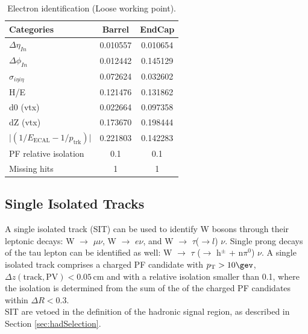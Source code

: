 \begin{table}[h!]
  \caption{Electron identification (Loose working point).\label{tab:ele-id}}
  \centering
  \footnotesize
  \begin{tabular}{ lcc }
    \hline
    \hline
    Categories                                               & Barrel    & EndCap    \\
    \hline
    $\Delta \eta_{In}$                                       & 0.010557  & 0.010654  \\
    $\Delta \phi_{In}$                                       & 0.012442  & 0.145129  \\
    $\sigma_{i\eta i\eta}$                                   & 0.072624  & 0.032602  \\
    H/E                                                      & 0.121476  & 0.131862  \\
    d0 (vtx)                                                 & 0.022664  & 0.097358  \\
    dZ (vtx)                                                 & 0.173670  & 0.198444  \\
    $\lvert(1/E_{\textrm{ECAL}} - 1/p_{\textrm{trk}})\rvert$ & 0.221803  & 0.142283  \\
    PF relative isolation                                    & 0.1       & 0.1       \\
    Missing hits                                             & 1         & 1         \\
    \hline
    \hline
  \end{tabular}
  \end{table}


\subsection{Single Isolated Tracks}
\label{sec:SIT}

A single isolated track (SIT) can be used to identify W bosons through their leptonic decays: 
W $\rightarrow$ $\mu \nu$, W $\rightarrow$ $e\nu$, and W $\rightarrow$ $\tau$($\rightarrow l$) $\nu$. 
Single prong decays of the tau lepton can be identified as well: W $\rightarrow$ $\tau$ ($\rightarrow$ h$^{\pm}$ + n$\pi^{0}$) $\nu$. 
A single isolated track comprises a charged PF candidate with $\Pt > 10 \gev$, $\Delta z(\mathrm{track}, \mathrm{PV}) < 0.05 \, \mathrm{cm}$ 
and with a relative isolation smaller than 0.1, where the isolation is determined from the sum 
of the \Pt of the charged PF candidates within $\Delta R < 0.3$.\\
SIT are vetoed in the definition of the hadronic signal region, 
as described in Section \ref{sec:hadSelection}.

